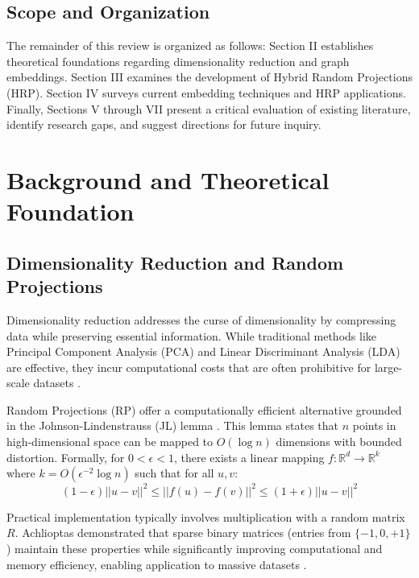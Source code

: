 \documentclass[conference]{IEEEtran}
\begin{document}
\subsection{Scope and Organization}

The remainder of this review is organized as follows: Section II establishes theoretical foundations regarding dimensionality reduction and graph embeddings. Section III examines the development of Hybrid Random Projections (HRP). Section IV surveys current embedding techniques and HRP applications. Finally, Sections V through VII present a critical evaluation of existing literature, identify research gaps, and suggest directions for future inquiry.

\section{Background and Theoretical Foundation}

\subsection{Dimensionality Reduction and Random Projections}

Dimensionality reduction addresses the curse of dimensionality by compressing data while preserving essential information. While traditional methods like Principal Component Analysis (PCA) and Linear Discriminant Analysis (LDA) are effective, they incur computational costs that are often prohibitive for large-scale datasets \cite{xie2018survey, siddharth2017randpro}.

Random Projections (RP) offer a computationally efficient alternative grounded in the Johnson-Lindenstrauss (JL) lemma \cite{johnson1984}. This lemma states that $n$ points in high-dimensional space can be mapped to $O(\log n)$ dimensions with bounded distortion. Formally, for $0 < \epsilon < 1$, there exists a linear mapping $f: \mathbb{R}^d \rightarrow \mathbb{R}^k$ where $k = O(\epsilon^{-2} \log n)$ such that for all $u, v$:
\begin{equation}
(1-\epsilon)||u-v||^2 \leq ||f(u)-f(v)||^2 \leq (1+\epsilon)||u-v||^2
\end{equation}

Practical implementation typically involves multiplication with a random matrix $R$. Achlioptas demonstrated that sparse binary matrices (entries from $\{-1, 0, +1\}$) maintain these properties while significantly improving computational and memory efficiency, enabling application to massive datasets \cite{achlioptas2003, blum2006}.
\end{document}
